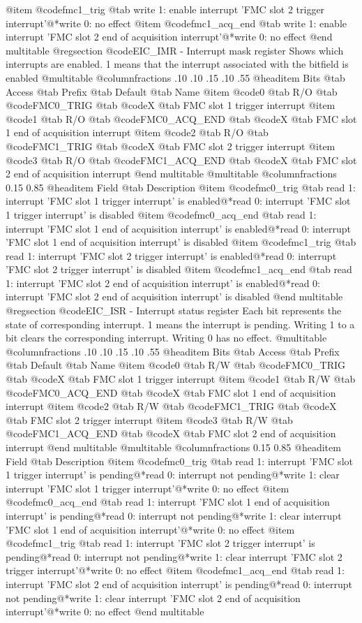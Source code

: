 @item @code{fmc1_trig} @tab write 1: enable interrupt 'FMC slot 2 trigger interrupt'@*write 0: no effect
@item @code{fmc1_acq_end} @tab write 1: enable interrupt 'FMC slot 2 end of acquisition interrupt'@*write 0: no effect
@end multitable
@regsection @code{EIC_IMR} - Interrupt mask register
Shows which interrupts are enabled. 1 means that the interrupt associated with the bitfield is enabled
@multitable @columnfractions .10 .10 .15 .10 .55
@headitem Bits @tab Access @tab Prefix @tab Default @tab Name
@item @code{0}
@tab R/O @tab
@code{FMC0_TRIG}
@tab @code{X} @tab 
FMC slot 1 trigger interrupt
@item @code{1}
@tab R/O @tab
@code{FMC0_ACQ_END}
@tab @code{X} @tab 
FMC slot 1 end of acquisition interrupt
@item @code{2}
@tab R/O @tab
@code{FMC1_TRIG}
@tab @code{X} @tab 
FMC slot 2 trigger interrupt
@item @code{3}
@tab R/O @tab
@code{FMC1_ACQ_END}
@tab @code{X} @tab 
FMC slot 2 end of acquisition interrupt
@end multitable
@multitable @columnfractions 0.15 0.85
@headitem Field @tab Description
@item @code{fmc0_trig} @tab read 1: interrupt 'FMC slot 1 trigger interrupt' is enabled@*read 0: interrupt 'FMC slot 1 trigger interrupt' is disabled
@item @code{fmc0_acq_end} @tab read 1: interrupt 'FMC slot 1 end of acquisition interrupt' is enabled@*read 0: interrupt 'FMC slot 1 end of acquisition interrupt' is disabled
@item @code{fmc1_trig} @tab read 1: interrupt 'FMC slot 2 trigger interrupt' is enabled@*read 0: interrupt 'FMC slot 2 trigger interrupt' is disabled
@item @code{fmc1_acq_end} @tab read 1: interrupt 'FMC slot 2 end of acquisition interrupt' is enabled@*read 0: interrupt 'FMC slot 2 end of acquisition interrupt' is disabled
@end multitable
@regsection @code{EIC_ISR} - Interrupt status register
Each bit represents the state of corresponding interrupt. 1 means the interrupt is pending. Writing 1 to a bit clears the corresponding interrupt. Writing 0 has no effect.
@multitable @columnfractions .10 .10 .15 .10 .55
@headitem Bits @tab Access @tab Prefix @tab Default @tab Name
@item @code{0}
@tab R/W @tab
@code{FMC0_TRIG}
@tab @code{X} @tab 
FMC slot 1 trigger interrupt
@item @code{1}
@tab R/W @tab
@code{FMC0_ACQ_END}
@tab @code{X} @tab 
FMC slot 1 end of acquisition interrupt
@item @code{2}
@tab R/W @tab
@code{FMC1_TRIG}
@tab @code{X} @tab 
FMC slot 2 trigger interrupt
@item @code{3}
@tab R/W @tab
@code{FMC1_ACQ_END}
@tab @code{X} @tab 
FMC slot 2 end of acquisition interrupt
@end multitable
@multitable @columnfractions 0.15 0.85
@headitem Field @tab Description
@item @code{fmc0_trig} @tab read 1: interrupt 'FMC slot 1 trigger interrupt' is pending@*read 0: interrupt not pending@*write 1: clear interrupt 'FMC slot 1 trigger interrupt'@*write 0: no effect
@item @code{fmc0_acq_end} @tab read 1: interrupt 'FMC slot 1 end of acquisition interrupt' is pending@*read 0: interrupt not pending@*write 1: clear interrupt 'FMC slot 1 end of acquisition interrupt'@*write 0: no effect
@item @code{fmc1_trig} @tab read 1: interrupt 'FMC slot 2 trigger interrupt' is pending@*read 0: interrupt not pending@*write 1: clear interrupt 'FMC slot 2 trigger interrupt'@*write 0: no effect
@item @code{fmc1_acq_end} @tab read 1: interrupt 'FMC slot 2 end of acquisition interrupt' is pending@*read 0: interrupt not pending@*write 1: clear interrupt 'FMC slot 2 end of acquisition interrupt'@*write 0: no effect
@end multitable
